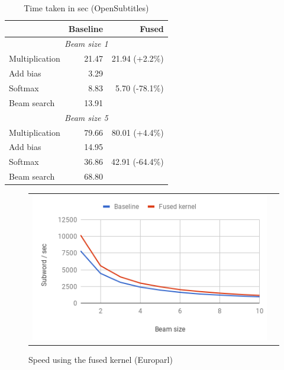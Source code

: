 \documentclass[11pt,a4paper]{article}
\begin{document}
\begin{table}
\begin{center}
\small
\begin{tabular}{|l|r|r|} \hline
		& Baseline	& Fused \\ \hline
\multicolumn{3}{|c|}{\emph{Beam size 1}}	\\ \hline	
Multiplication 	& 21.47 	& 21.94 (+2.2\%) \\ \hline
Add bias 	& 3.29		&  \\ 
Softmax 	& 8.83		& 5.70 (-78.1\%)\\
Beam search	& 13.91		&  \\ \hline
\multicolumn{3}{|c|}{\emph{Beam size 5}}	\\ \hline	
Multiplication 	& 79.66 	& 80.01 (+4.4\%) \\ \hline
Add bias 	& 14.95		&  \\ 
Softmax 	& 36.86		& 42.91 (-64.4\%)\\
Beam search	& 68.80		&  \\ \hline
\end{tabular}
\end{center}
\caption{Time taken in sec (OpenSubtitles)}
\label{tab:fused-breakdown-opensubtitles}
\end{table}


\begin{figure}
\centering
\begin{tabular}{cc}
{\includegraphics[scale=0.5]{beam-europarl.png}} 
\end{tabular}
\caption{Speed using the fused kernel (Europarl)}
\label{fig:beam-europarl}
\end{figure} 
\end{document}
